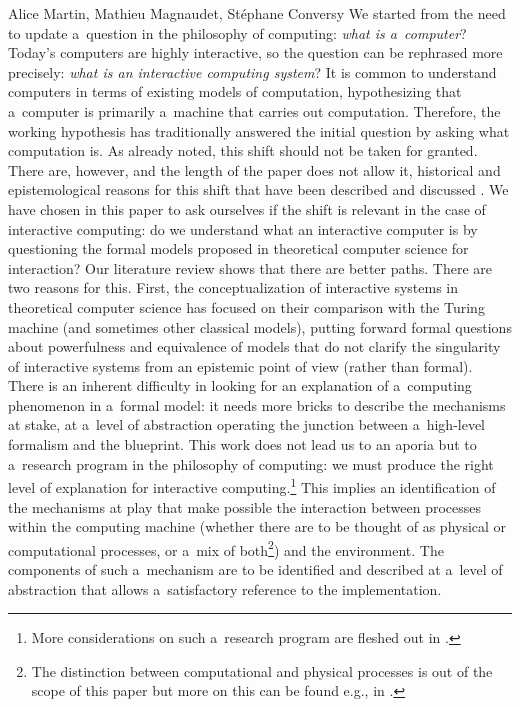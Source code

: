 \begin{artengenv2auth}{Alice Martin, Mathieu Magnaudet, Stéphane Conversy}
We started from the need to update a~question in the philosophy of computing: \textit{what is a~computer}? Today's computers are highly interactive, so the question can be rephrased more precisely: \textit{what is an interactive computing system}? It is common to understand computers in terms of existing models of computation, hypothesizing that a~computer is primarily a~machine that carries out computation. Therefore, the working hypothesis has traditionally answered the initial question by asking what computation is. As already noted, this shift should not be taken for granted. There are, however, and the length of the paper does not allow it, historical and epistemological reasons for this shift that have been described and discussed \parencite{Daylight2014, DeMol2018a, Haigh2020}. We have chosen in this paper to ask ourselves if the shift is relevant in the case of interactive computing: do we understand what an interactive computer is by questioning the formal models proposed in theoretical computer science for interaction? Our literature review shows that there are better paths. There are two reasons for this. First, the conceptualization of interactive systems in theoretical computer science has focused on their comparison with the Turing machine (and sometimes other classical models), putting forward formal questions about powerfulness and equivalence of models that do not clarify the singularity of interactive systems from an epistemic point of view (rather than formal). There is an inherent difficulty in looking for an explanation of a~computing phenomenon in a~formal model: it needs more bricks to describe the mechanisms at stake, at a~level of abstraction operating the junction between a~high-level formalism and the blueprint. This work does not lead us to an aporia but to a~research program in the philosophy of computing: we must produce the right level of explanation for interactive computing.\footnote{More considerations on such a~research program are fleshed out in \parencite{Martin2023}.} This implies an identification of the mechanisms at play that make possible the interaction between processes within the computing machine (whether there are to be thought of as physical or computational processes, or a~mix of both\footnote{The distinction between computational and physical processes is out of the scope of this paper but more on this can be found e.g., in \parencite{Kycia_Niemczynowicz_2020}.}) and the environment. The components of such a~mechanism are to be identified and described at a~level of abstraction that allows a~satisfactory reference to the implementation. 

 


%
%
%
%

\end{artengenv2auth}

